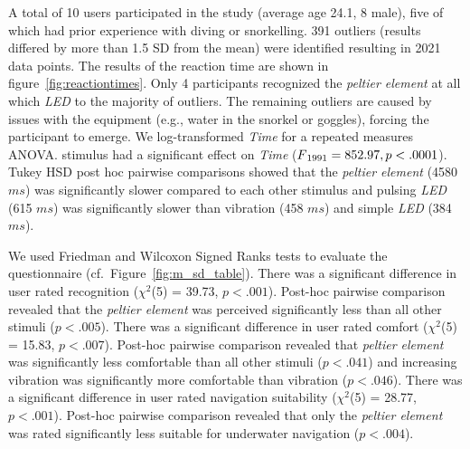 %
%

A total of 10 users participated in the study (average age 24.1, 8 male), five of which had prior experience with diving or snorkelling. 
391 outliers (results differed by more than 1.5 SD from the mean) were identified resulting in 2021 data points.
The results of the reaction time are shown in figure~\ref{fig:reactiontimes}.
Only 4 participants recognized the \emph{peltier element} at all which \emph{LED} to the majority of outliers. 
The remaining outliers are caused by issues with the equipment (e.g., water in the snorkel or goggles), forcing the participant to emerge.
We log-transformed \emph{Time} for a repeated measures ANOVA. 
{\sc stimulus} had a significant effect on \emph{Time} ($F\textsubscript{1991} = 852.97, p<.0001$). 
Tukey HSD post hoc pairwise comparisons showed that the \emph{peltier element} (4580$ms$) was significantly slower compared to each other {\sc stimulus} and pulsing \emph{LED} (615 $ms$) was significantly slower than vibration (458 $ms$) and simple \emph{LED} (384$ms$).

We used Friedman and Wilcoxon Signed Ranks tests to evaluate the questionnaire (cf.\ Figure~\ref{fig:m_sd_table}).
There was a significant difference in user rated recognition ($\chi^2$(5) = 39.73, $p<.001$).
Post-hoc pairwise comparison revealed that the \emph{peltier element} was perceived significantly less than all other stimuli ($p<.005$). \newline
There was a significant difference in user rated comfort ($\chi^2$(5) = 15.83, $p<.007$).
Post-hoc pairwise comparison revealed that \emph{peltier element} was significantly less comfortable than all other stimuli ($p<.041$) and increasing vibration was significantly more comfortable than vibration ($p<.046$). \newline
There was a significant difference in user rated navigation suitability ($\chi^2$(5) = 28.77, $p<.001$). 
Post-hoc pairwise comparison revealed that only the \emph{peltier element} was rated significantly less suitable for underwater navigation ($p<.004$).

